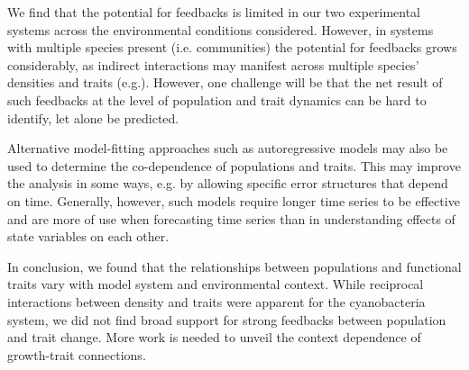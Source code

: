 \documentclass{article}
\begin{document}
We find that the potential for feedbacks is limited in our two experimental systems across the environmental conditions considered. However, in systems with multiple species present (i.e. communities) the potential for feedbacks grows considerably, as indirect interactions may manifest across multiple species' densities and traits (e.g.\cite{Zelnik2022a}). However, one challenge will be that the net result of such feedbacks at the level of population and trait dynamics can be hard to identify, let alone be predicted.

Alternative model-fitting approaches such as autoregressive models may also be used to determine the co-dependence of populations and traits. This may improve the analysis in some ways, e.g. by allowing specific error structures that depend on time. Generally, however, such models require longer time series to be effective and are more of use when forecasting time series than in understanding effects of state variables on each other. %

In conclusion, we found that the relationships between populations and functional traits vary with model system and environmental context. While reciprocal interactions between density and traits were apparent for the cyanobacteria system, we did not find broad support for strong feedbacks between population and trait change. More work is needed to unveil the context dependence of growth-trait connections.



\end{document}
